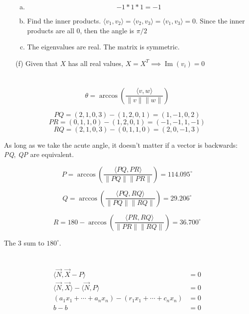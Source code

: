 \documentclass[12pt]{article}
\begin{document}
\begin{enumerate}
\begin{enumerate}[(a)]
		\item \[ -1*1*1 = -1 \]
		
		\item Find the inner products. $ \langle v_1, v_2 \rangle = \langle v_2, v_3 \rangle = \langle v_1, v_3 \rangle = 0 $. Since the inner products are all 0, then the angle is $ \pi/2 $
		
		\item The eigenvalues are real. The matrix is symmetric.
	\end{enumerate}

	\item [(f)]
	Given that $ X $ has all real values, $ X = X^T \implies \operatorname{Im}(v_i) = 0$ 
\end{enumerate}
\newpage

\section{}
\[ \theta = \arccos\left(\dfrac{\langle v, w\rangle}{\|v\| \|w\|}\right) \]

\[ \mathit{PQ} = (2,1,0,3) - (1,2,0,1) = (1,-1,0,2) \]
\[ \mathit{PR} = (0,1,1,0) - (1,2,0,1) = (-1,-1,1,-1) \]
\[ \mathit{RQ} = (2,1,0,3) - (0,1,1,0) = (2,0,-1,3) \]

As long as we take the acute angle, it doesn't matter if a vector is backwards: \textit{PQ}, \textit{QP} are equivalent.

\[ \textit{P} = \arccos\left(\dfrac{\langle \mathit{PQ}, \mathit{PR}\rangle}{\|\mathit{PQ}\| \|\mathit{PR}\|}\right) = 114.095^{\circ}\]

\[ \textit{Q} = \arccos\left(\dfrac{\langle \mathit{PQ},\mathit{RQ}\rangle}{\|\mathit{PQ}\| \|\mathit{RQ}\|}\right) = 29.206^{\circ}\]

\[ \textit{R} = 180-\arccos\left(\dfrac{\langle\mathit{PR},\mathit{RQ}\rangle}{\|\mathit{PR}\| \|\mathit{RQ}\|}\right) = 36.700^{\circ}\]

The 3 sum to $ 180^{\circ} $.
\newpage

\section{}
\begin{align*}
	\langle \vec{N}, \vec{X}-P\rangle &= 0\\
	\langle\vec{N}, \vec{X} \rangle - \langle \vec{N}, P\rangle &= 0\\
	(a_1x_1 + \cdots + a_nx_n) - (r_1x_1 + \cdots + c_nx_n) &= 0\\ \tag{solves means evals to $b$}
	b - b &= 0
\end{align*}
\newpage
\end{document}
